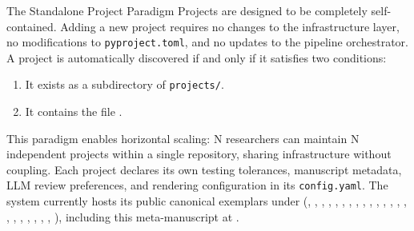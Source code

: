 \documentclass[
  ignorenonframetext,
]{beamer}
\providecommand{\tightlist}{%
  \setlength{\itemsep}{0pt}\setlength{\parskip}{0pt}}
\begin{document}
\begin{frame}{The Standalone Project Paradigm}
\protect{}\label{the-standalone-project-paradigm}
Projects are designed to be completely self-contained. Adding a new
project requires no changes to the infrastructure layer, no
modifications to \texttt{pyproject.toml}, and no updates to the pipeline
orchestrator. A project is automatically discovered if and only if it
satisfies two conditions:

\begin{enumerate}
\tightlist
\item
  It exists as a subdirectory of \texttt{projects/}.
\item
  It contains the file .
\end{enumerate}

This paradigm enables horizontal scaling: N researchers can maintain N
independent projects within a single repository, sharing infrastructure
without coupling. Each project declares its own testing tolerances,
manuscript metadata, LLM review preferences, and rendering configuration
in its \texttt{config.yaml}. The system currently hosts its public
canonical exemplars under 
(,
,
,
,
,
,
,
,
,
,
,
,
,
,
,
,
,
,
,
,
,
,
), including this meta-manuscript
at .
\end{frame}
\end{document}
